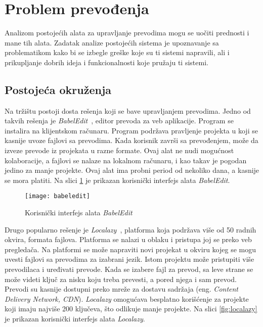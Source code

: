 \section{Problem prevođenja}\label{ch:analiza}

Analizom postojećih alata za upravljanje prevodima mogu se uočiti prednosti i mane tih alata. 
Zadatak analize postojećih sistema je upoznavanje sa problematikom kako bi se izbegle greške
koje su ti sistemi napravili, ali i prikupljanje dobrih ideja i funkcionalnosti koje pružaju ti sistemi.


\subsection{Postojeća okruženja}\label{sec:analiza-postojeca_okruzenja}

Na tržištu postoji dosta rešenja koji se bave upravljanjem prevodima. Jedno od takvih rešenja je 
\textit{BabelEdit}~\cite{BabelEdit}, editor prevoda za veb aplikacije. Program se instalira na klijentskom računaru.
Program podržava pravljenje projekta u koji se kasnije uvoze fajlovi sa prevodima. Kada korisnik završi 
sa prevođenjem, može da izveze prevode iz projekata u razne formate. Ovaj alat ne nudi mogućnost kolaboracije,
a fajlovi se nalaze na lokalnom računaru, i kao takav je pogodan jedino za manje projekte. Ovaj alat ima 
probni period od nekoliko dana, a kasnije se mora platiti. Na slici \ref{fig:babeledit} je prikazan korisnički
interfejs alata \textit{BabelEdit}.

\begin{figure}[h]
    \centering
    \texttt{[image: babeledit]}
    \caption{Korisnički interfejs alata \textit{BabelEdit}}
    \label{fig:babeledit}
\end{figure}

Drugo popularno rešenje je \textit{Localazy}~\cite{Localazy}, platforma koja podržava više od 50 radnih okvira, 
formata fajlova. Platforma se nalazi u oblaku i pristupa joj se preko veb pregledača. Na platformi se može 
napraviti novi projekat u okviru kojeg se mogu uvesti fajlovi sa prevodima za izabrani jezik. Istom projektu 
može pristupiti više prevodilaca i uređivati prevode. Kada se izabere fajl za prevod, sa leve strane se može 
videti ključ za nisku koju treba prevesti, a pored njega i sam prevod. Prevodi su kasnije dostupni preko 
mreže za dostavu sadržaja (eng. \textit{Content Delivery Network, CDN}). \textit{Localazy} omogućava besplatno korišćenje za 
projekte koji imaju najviše 200 ključeva, što odlikuje manje projekte. Na slici \ref{fig:localazy} je prikazan korisnički
interfejs alata \textit{Localazy}.

